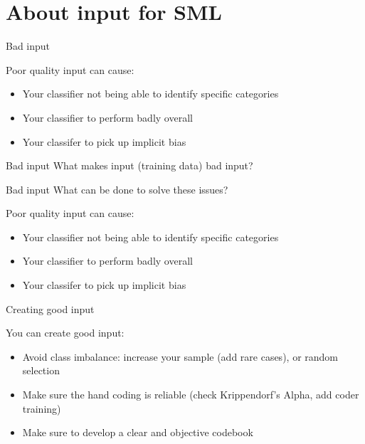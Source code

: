 \documentclass[compress]{beamer}
\begin{document}
\section{About input for SML}

\begin{frame}[fragile]{Bad input}
\begin{alertblock}{Poor quality input can cause:}
	\begin{itemize}
		\item Your classifier not being able to identify specific categories %
		\item Your classifier to perform badly overall %
		\item Your classifer to pick up implicit bias %
	\end{itemize}
\end{alertblock}
\end{frame}


\begin{frame}[fragile]{Bad input}
What makes input (training data) bad input?
\end{frame}


\begin{frame}[fragile]{Bad input}
What can be done to solve these issues?
\begin{alertblock}{Poor quality input can cause:}
	\begin{itemize}
		\item Your classifier not being able to identify specific categories %
		\item Your classifier to perform badly overall %
		\item Your classifer to pick up implicit bias %
	\end{itemize}
\end{alertblock}
\end{frame}



\begin{frame}[fragile]{Creating good input}
\begin{alertblock}{You can create good input:}
	\begin{itemize}
		\item Avoid class imbalance: increase your sample (add rare cases), or random selection %
		\item Make sure the hand coding is reliable (check Krippendorf's Alpha, add coder training) %
		\item Make sure to develop a clear and objective codebook %
	\end{itemize}
\end{alertblock}
\end{frame}
\end{document}
